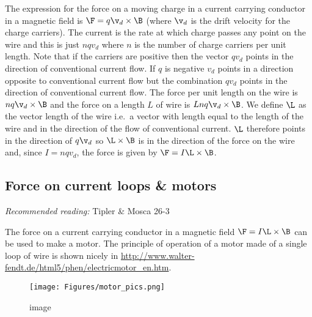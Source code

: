 \documentclass[
]{book}
\theoremstyle{definition}
\theoremstyle{definition}
\theoremstyle{definition}
\theoremstyle{definition}
\theoremstyle{remark}
\begin{document}
The expression for the force on a moving charge in a current carrying
conductor in a magnetic field is \(\F = q\v_d \times \B\) (where \(\v_d\) is
the drift velocity for the charge carriers). The current is the rate at
which charge passes any point on the wire and this is just \(nqv_d\) where
\(n\) is the number of charge carriers per unit length. Note that if the
carriers are positive then the vector \(qv_d\) points in the direction of
conventional current flow. If \(q\) is negative \(v_d\) points in a
direction opposite to conventional current flow but the combination
\(qv_d\) points in the direction of conventional current flow. The force
per unit length on the wire is \(nq \v_d \times \B\) and the force on a
length \(L\) of wire is \(Lnq \v_d \times \B\). We define \(\L\) as the vector
length of the wire i.e.~a vector with length equal to the length of the
wire and in the direction of the flow of conventional current. \(\L\)
therefore points in the direction of \(q \v_d\) so \(\L \times \B\) is in
the direction of the force on the wire and, since \(I = nq v_d\), the
force is given by \(\F = I \L \times \B\).

\hypertarget{force-on-current-loops-motors}{%
\subsection{Force on current loops \& motors}\label{force-on-current-loops-motors}}

\emph{Recommended reading:} Tipler \& Mosca 26-3

The force on a current carrying conductor in a magnetic field
\(\F = I \L \times \B\) can be used to make a motor. The principle of
operation of a motor made of a single loop of wire is shown nicely in
\url{http://www.walter-fendt.de/html5/phen/electricmotor_en.htm}.

\begin{figure}
\centering
\texttt{[image: Figures/motor\_pics.png]}
\caption{image}
\end{figure}
\end{document}
